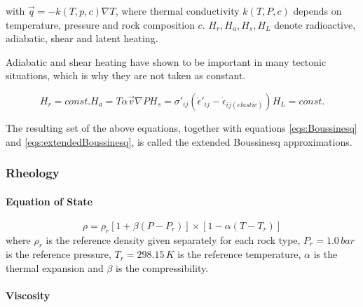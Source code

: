 with $\vec{q} = -k(T, p, c) \nabla T$, where thermal conductivity $k(T, P, c)$ depends on temperature, pressure and rock composition $c$. $H_r, H_a, H_s, H_L$ denote radioactive, adiabatic, shear and latent heating.

Adiabatic and shear heating have shown to be important in many tectonic situations, which is why they are not taken as constant.

\begin{subequations}\label{eqs:extendedBoussinesq}
\begin{equation}
H_r = const.
\end{equation}
\begin{equation}
H_a = T \alpha \vec{v} \nabla P
\end{equation}
\begin{equation}
H_s = \sigma'_{ij} \left(\dot{\epsilon}'_{ij} - \dot{\epsilon}_{ij(elastic)} \right)
\end{equation}
\begin{equation}
H_L = const.
\end{equation}
\end{subequations}

The resulting set of the above equations, together with equations \eqref{eqs:Boussinesq} and \eqref{eqs:extendedBoussinesq}, is called the extended Boussinesq approximations.

\subsubsection{Rheology}

\paragraph{Equation of State}
\begin{equation}\label{eqs:EOS}
\rho = \rho_r  \left[ 1 + \beta \left( P - P_r \right) \right] \times \left[ 1 - \alpha \left( T - T_r \right) \right]
\end{equation}
where $\rho_r$ is the reference density given separately for each rock type, $P_r=1.0\,bar$ is the reference pressure, $T_r=298.15\,K$ is the reference temperature, $\alpha$ is the thermal expansion and $\beta$ is the compressibility.

\paragraph{Viscosity}
